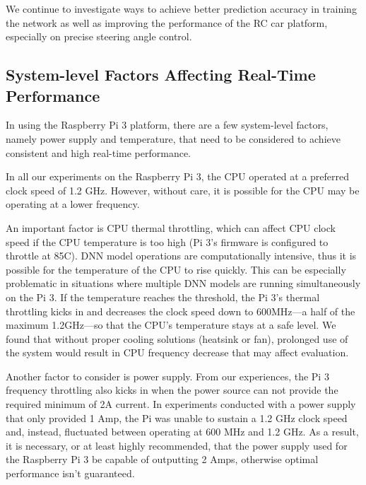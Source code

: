 We continue to investigate ways to achieve better prediction accuracy
in training the network as well as improving the performance of the RC
car platform, especially on precise steering angle control.



\subsection{System-level Factors Affecting Real-Time Performance}
In using the Raspberry Pi 3 platform, there are a
few system-level factors, namely power supply and temperature, that
need to be considered to achieve consistent and high real-time
performance. 

In all our experiments on the Raspberry Pi 3, the CPU  operated at a
preferred clock speed of 1.2 GHz. However, without care, it is
possible for the CPU may be operating at a lower frequency. 

An important factor is CPU thermal throttling, which can affect CPU
clock speed if the CPU temperature is too high (Pi 3's firmware is
configured to throttle at 85C).
DNN model operations are computationally intensive, thus it is
possible for the temperature of the CPU to rise quickly. This can be
especially problematic in situations where multiple DNN models are
running simultaneously on the Pi 3.
If the temperature reaches the threshold, the Pi 3's thermal
throttling kicks in and decreases the clock speed down to 600MHz---a
half of the maximum 1.2GHz---so that the CPU's temperature stays at a
safe level.
We found that without proper cooling solutions (heatsink or fan), 
prolonged use of the system would result in CPU frequency decrease
that may affect evaluation.

Another factor to consider is power supply. From our experiences, the
Pi 3 frequency throttling also kicks in when the power source can not
provide the required minimum of 2A current.
In experiments conducted with a power supply that only provided 1 Amp,
the Pi was unable to sustain a 1.2 GHz clock speed and, instead,
fluctuated between operating at 600 MHz and 1.2 GHz. As a result, it
is necessary, or at least highly recommended, that the power supply
used for the Raspberry Pi 3 be capable of outputting 2 Amps, otherwise
optimal performance isn't guaranteed.

